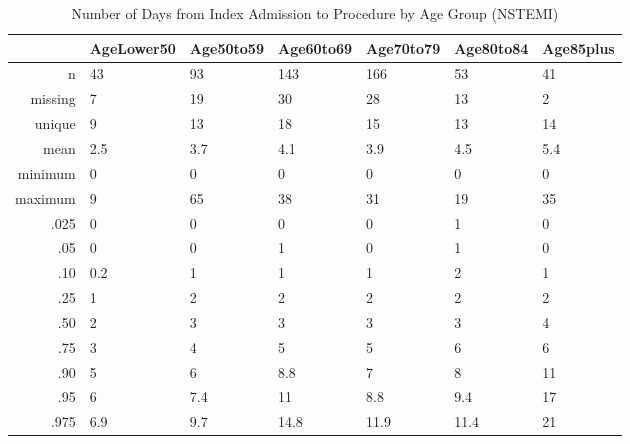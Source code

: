 \documentclass[a4paper]{report}
\begin{document}
\begin{itemize}
{%
\begin{table}[ht]
\centering
\begin{tabular}{rllllll}
  \toprule
 & AgeLower50 & Age50to59 & Age60to69 & Age70to79 & Age80to84 & Age85plus \\ 
  \midrule
n & 43 & 93 & 143 & 166 & 53 & 41 \\ 
  missing & 7 & 19 & 30 & 28 & 13 & 2 \\ 
  unique & 9 & 13 & 18 & 15 & 13 & 14 \\ 
  mean & 2.5 & 3.7 & 4.1 & 3.9 & 4.5 & 5.4 \\ 
  minimum & 0 & 0 & 0 & 0 & 0 & 0 \\ 
  maximum & 9 & 65 & 38 & 31 & 19 & 35 \\ 
  .025 & 0 & 0 & 0 & 0 & 1 & 0 \\ 
  .05 & 0 & 0 & 1 & 0 & 1 & 0 \\ 
  .10 & 0.2 & 1 & 1 & 1 & 2 & 1 \\ 
  .25 & 1 & 2 & 2 & 2 & 2 & 2 \\ 
  .50 & 2 & 3 & 3 & 3 & 3 & 4 \\ 
  .75 & 3 & 4 & 5 & 5 & 6 & 6 \\ 
  .90 & 5 & 6 & 8.8 & 7 & 8 & 11 \\ 
  .95 & 6 & 7.4 & 11 & 8.8 & 9.4 & 17 \\ 
  .975 & 6.9 & 9.7 & 14.8 & 11.9 & 11.4 & 21 \\ 
   \bottomrule
\end{tabular}
\caption{Number of Days from Index Admission to Procedure by Age Group (NSTEMI)} 
\end{table}

}
\end{itemize}
\end{document}
